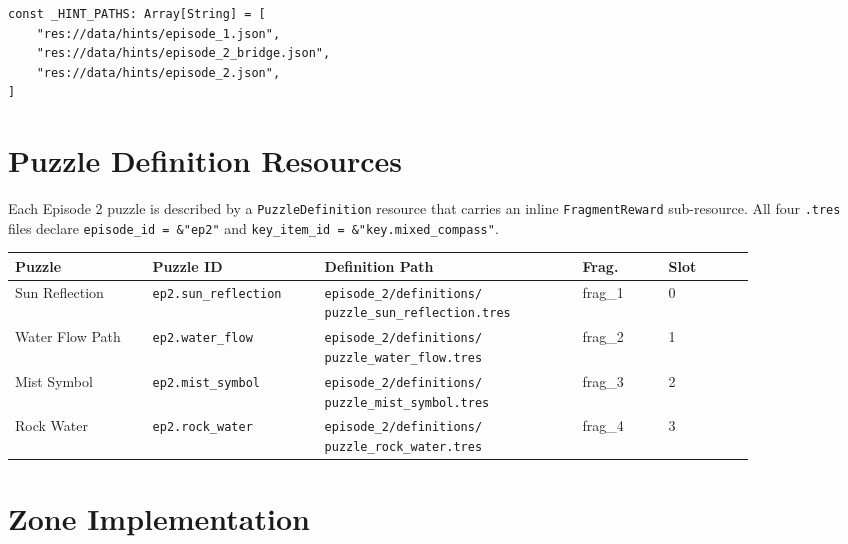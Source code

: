 \documentclass[12pt, a4paper]{article}
\begin{document}
\begin{lstlisting}
const _HINT_PATHS: Array[String] = [
    "res://data/hints/episode_1.json",
    "res://data/hints/episode_2_bridge.json",
    "res://data/hints/episode_2.json",
]
\end{lstlisting}

\section{Puzzle Definition Resources}

Each Episode 2 puzzle is described by a \texttt{PuzzleDefinition} resource
that carries an inline \texttt{FragmentReward} sub-resource. All four
\texttt{.tres} files declare \texttt{episode\_id = \&"ep2"} and
\texttt{key\_item\_id = \&"key.mixed\_compass"}.

\begin{center}
\begin{longtable}{p{0.16\linewidth} p{0.20\linewidth} p{0.30\linewidth} p{0.10\linewidth} p{0.10\linewidth}}
\toprule
\textbf{Puzzle} & \textbf{Puzzle ID} & \textbf{Definition Path} & \textbf{Frag.} & \textbf{Slot} \\
\midrule
\endfirsthead
\bottomrule
\endlastfoot

Sun Reflection &
\texttt{ep2.sun\_reflection} &
\texttt{episode\_2/definitions/} \texttt{puzzle\_sun\_reflection.tres} &
frag\_1 & 0 \\

Water Flow Path &
\texttt{ep2.water\_flow} &
\texttt{episode\_2/definitions/} \texttt{puzzle\_water\_flow.tres} &
frag\_2 & 1 \\

Mist Symbol &
\texttt{ep2.mist\_symbol} &
\texttt{episode\_2/definitions/} \texttt{puzzle\_mist\_symbol.tres} &
frag\_3 & 2 \\

Rock Water &
\texttt{ep2.rock\_water} &
\texttt{episode\_2/definitions/} \texttt{puzzle\_rock\_water.tres} &
frag\_4 & 3 \\

\end{longtable}
\end{center}

\section{Zone Implementation}
\end{document}
